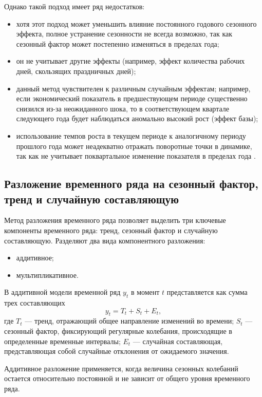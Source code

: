 \documentclass[a4paper, 14pt]{extreport}
\numberwithin{equation}{section}
\numberwithin{equation}{section}
\begin{document}
 	Однако такой подход имеет ряд недостатков:
 	\begin{itemize}
 		\item хотя этот подход может уменьшить влияние постоянного годового сезонного эффекта, полное устранение сезонности не всегда возможно, так как сезонный фактор может постепенно изменяться в пределах года;
 		\item он не учитывает другие эффекты (например, эффект количества рабочих дней, скользящих праздничных дней); 
 		\item данный метод чувствителен к различным случайным эффектам; например, если экономический показатель в предшествующем периоде существенно снизился из-за неожиданного шока, то в соответствующем квартале следующего года будет наблюдаться аномально высокий рост (эффект базы);
 		\item использование темпов роста в текущем периоде к аналогичному периоду прошлого года может неадекватно отражать поворотные точки в динамике, так как не учитывает поквартальное изменение показателя в пределах года \cite{17}.
 	\end{itemize} 
	\subsection{Разложение временного ряда на сезонный фактор, тренд и случайную составляющую} \label{subsec:decomp}
	Метод разложения временного ряда позволяет выделить три ключевые компоненты временного ряда: тренд, сезонный фактор и случайную составляющую. Разделяют два вида компонентного разложения:
	\begin{itemize}
		\item аддитивное;
		\item мультипликативное.
	\end{itemize}
	В аддитивной модели временной ряд $y_t$ в момент $t$ представляется как сумма трех составляющих
	\begin{equation}
		y_t = T_t + S_t + E_t,
	\end{equation}
	где $T_t$ --- тренд, отражающий общее направление изменений во времени; $S_t$ --- сезонный фактор, фиксирующий регулярные колебания, происходящие в определенные временные интервалы; $E_t$ --- случайная составляющая, представляющая собой случайные отклонения от ожидаемого значения.
	
	Аддитивное разложение применяется, когда величина сезонных колебаний остается относительно постоянной и не зависит от общего уровня временного ряда.
\end{document}
